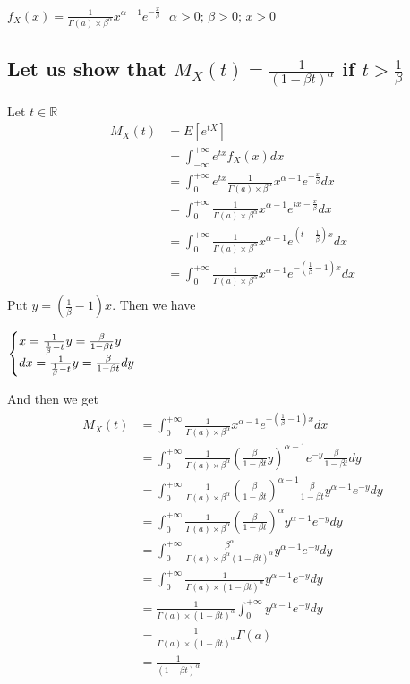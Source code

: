 \documentclass[11pt]{article}
\def\gt{>}
\begin{document}
 $f_X(x)=\frac{1}{\Gamma(a)\times \beta ^\alpha} x^{\alpha-1}e^{-\frac{x}{\beta}}\text{ } \alpha \gt 0 \text{; } \beta \gt 0 \text{; }x\gt 0$
 
 \subsection{Let us show that $M_X(t)=\frac{1}{(1-\beta t)^\alpha}$ if $t\gt \frac{1}{\beta}$}
Let $t \in \mathbb{R}$
\begin{align*}
M_X(t)&=E[e^{tX}]\\
&=\int_{-\infty}^{+\infty} e^{tx}f_X(x)dx\\
&=\int_{0}^{+\infty} e^{tx}\frac{1}{\Gamma(a)\times \beta ^\alpha} x^{\alpha-1}e^{-\frac{x}{\beta}}dx\\
&=\int_{0}^{+\infty}\frac{1}{\Gamma(a)\times \beta ^\alpha} x^{\alpha-1}e^{tx-\frac{x}{\beta}}dx\\
&=\int_{0}^{+\infty}\frac{1}{\Gamma(a)\times \beta ^\alpha} x^{\alpha-1}e^{(t-\frac{1}{\beta})x}dx\\
&=\int_{0}^{+\infty}\frac{1}{\Gamma(a)\times \beta ^\alpha} x^{\alpha-1}e^{-(\frac{1}{\beta}-1)x}dx\\
\end{align*}
Put $y=(\frac{1}{\beta}-1)x$. Then we have

$\begin{cases}
x=\frac{1}{\frac{1}{\beta}-t}y=\frac{\beta}{1-\beta t}y \\
dx=\frac{1}{\frac{1}{\beta}-t}y=\frac{\beta}{1-\beta t}dy \\
            
\end{cases}\\ $  

And then we get 
\begin{align*}
M_X(t)
&=\int_{0}^{+\infty}\frac{1}{\Gamma(a)\times \beta ^\alpha} x^{\alpha-1}e^{-(\frac{1}{\beta}-1)x}dx\\
&=\int_{0}^{+\infty}\frac{1}{\Gamma(a)\times \beta ^\alpha} {(\frac{\beta}{1-\beta t}y) }^{\alpha-1}e^{-y}\frac{\beta}{1-\beta t}dy\\
&=\int_{0}^{+\infty}\frac{1}{\Gamma(a)\times \beta ^\alpha} {(\frac{\beta}{1-\beta t}) }^{\alpha-1}\frac{\beta}{1-\beta t} y ^{\alpha-1}e^{-y}dy\\
&=\int_{0}^{+\infty}\frac{1}{\Gamma(a)\times \beta ^\alpha} {(\frac{\beta}{1-\beta t}) }^{\alpha} y^{\alpha-1} e^{-y}dy\\
&=\int_{0}^{+\infty}\frac{\beta^\alpha}{\Gamma(a)\times \beta ^\alpha (1-\beta t)^\alpha} y^{\alpha-1} e^{-y}dy\\
&=\int_{0}^{+\infty}\frac{1}{\Gamma(a)\times (1-\beta t)^\alpha} y^{\alpha-1} e^{-y}dy\\
&=\frac{1}{\Gamma(a)\times (1-\beta t)^\alpha}\int_{0}^{+\infty} y^{\alpha-1} e^{-y}dy\\
&=\frac{1}{\Gamma(a)\times (1-\beta t)^\alpha}\Gamma(a) \\
&=\frac{1}{(1-\beta t)^\alpha} \\
\end{align*}    
\end{document}
